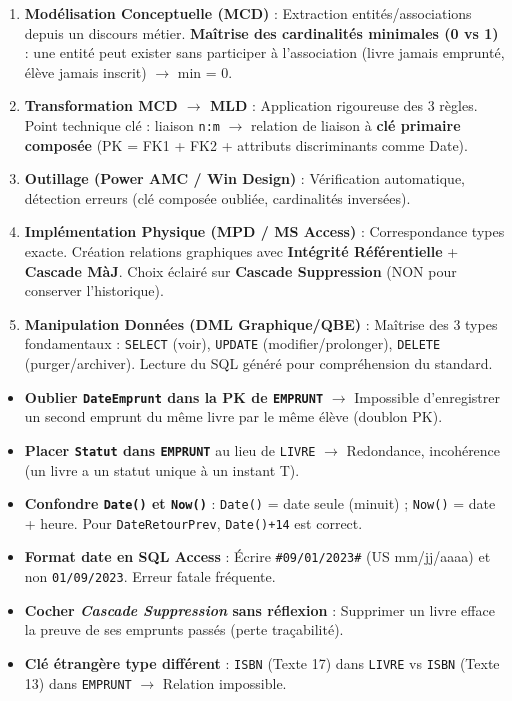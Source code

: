 \documentclass[11pt]{article}
\begin{document}
\begin{aretenir}
\begin{enumerate}
    \item \textbf{Modélisation Conceptuelle (MCD)} : Extraction entités/associations depuis un discours métier. \textbf{Maîtrise des cardinalités minimales (0 vs 1)} : une entité peut exister sans participer à l'association (livre jamais emprunté, élève jamais inscrit) $\rightarrow$ min = 0.
    \item \textbf{Transformation MCD $\rightarrow$ MLD} : Application rigoureuse des 3 règles. Point technique clé : liaison \texttt{n:m} $\rightarrow$ relation de liaison à \textbf{clé primaire composée} (PK = FK1 + FK2 + attributs discriminants comme Date).
    \item \textbf{Outillage (Power AMC / Win Design)} : Vérification automatique, détection erreurs (clé composée oubliée, cardinalités inversées).
    \item \textbf{Implémentation Physique (MPD / MS Access)} : Correspondance types exacte. Création relations graphiques avec \textbf{Intégrité Référentielle} + \textbf{Cascade MàJ}. Choix éclairé sur \textbf{Cascade Suppression} (NON pour conserver l'historique).
    \item \textbf{Manipulation Données (DML Graphique/QBE)} : Maîtrise des 3 types fondamentaux : \texttt{SELECT} (voir), \texttt{UPDATE} (modifier/prolonger), \texttt{DELETE} (purger/archiver). Lecture du SQL généré pour compréhension du standard.
\end{enumerate}
\end{aretenir}

\begin{attention}
\begin{itemize}
    \item \textbf{Oublier \texttt{DateEmprunt} dans la PK de \texttt{EMPRUNT}} $\rightarrow$ Impossible d'enregistrer un second emprunt du même livre par le même élève (doublon PK).
    \item \textbf{Placer \texttt{Statut} dans \texttt{EMPRUNT}} au lieu de \texttt{LIVRE} $\rightarrow$ Redondance, incohérence (un livre a un statut unique à un instant T).
    \item \textbf{Confondre \texttt{Date()} et \texttt{Now()}} : \texttt{Date()} = date seule (minuit) ; \texttt{Now()} = date + heure. Pour \texttt{DateRetourPrev}, \texttt{Date()+14} est correct.
    \item \textbf{Format date en SQL Access} : Écrire \texttt{\#09/01/2023\#} (US mm/jj/aaaa) et non \texttt{01/09/2023}. Erreur fatale fréquente.
    \item \textbf{Cocher \emph{Cascade Suppression} sans réflexion} : Supprimer un livre efface la preuve de ses emprunts passés (perte traçabilité).
    \item \textbf{Clé étrangère type différent} : \texttt{ISBN} (Texte 17) dans \texttt{LIVRE} vs \texttt{ISBN} (Texte 13) dans \texttt{EMPRUNT} $\rightarrow$ Relation impossible.
\end{itemize}
\end{attention}
\end{document}
